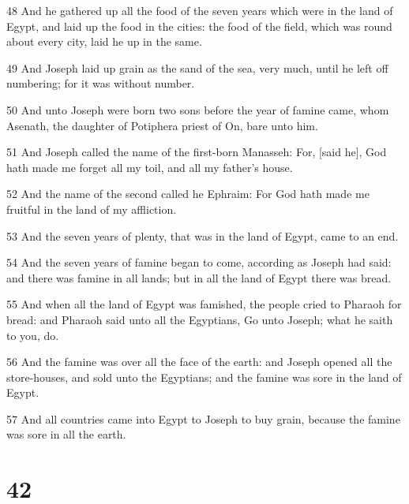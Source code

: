 \par 48 And he gathered up all the food of the seven years which were in the land of Egypt, and laid up the food in the cities: the food of the field, which was round about every city, laid he up in the same.
\par 49 And Joseph laid up grain as the sand of the sea, very much, until he left off numbering; for it was without number.
\par 50 And unto Joseph were born two sons before the year of famine came, whom Asenath, the daughter of Potiphera priest of On, bare unto him.
\par 51 And Joseph called the name of the first-born Manasseh: For, [said he], God hath made me forget all my toil, and all my father's house.
\par 52 And the name of the second called he Ephraim: For God hath made me fruitful in the land of my affliction.
\par 53 And the seven years of plenty, that was in the land of Egypt, came to an end.
\par 54 And the seven years of famine began to come, according as Joseph had said: and there was famine in all lands; but in all the land of Egypt there was bread.
\par 55 And when all the land of Egypt was famished, the people cried to Pharaoh for bread: and Pharaoh said unto all the Egyptians, Go unto Joseph; what he saith to you, do.
\par 56 And the famine was over all the face of the earth: and Joseph opened all the store-houses, and sold unto the Egyptians; and the famine was sore in the land of Egypt.
\par 57 And all countries came into Egypt to Joseph to buy grain, because the famine was sore in all the earth.

\chapter{42}

